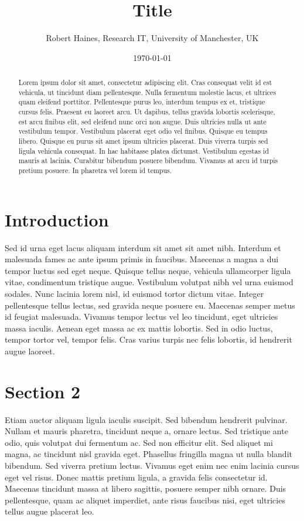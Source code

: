 \documentclass[11pt]{article}
\begin{document}
\title{Title}
\author{Robert Haines, Research IT, University of Manchester, UK}
\date{\today}
\maketitle

\begin{abstract}
Lorem ipsum dolor sit amet, consectetur adipiscing elit. Cras consequat velit id est vehicula, ut tincidunt diam pellentesque. Nulla fermentum molestie lacus, et ultrices quam eleifend porttitor. Pellentesque purus leo, interdum tempus ex et, tristique cursus felis. Praesent eu laoreet arcu. Ut dapibus, tellus gravida lobortis scelerisque, est arcu finibus elit, sed eleifend nunc orci non augue. Duis ultricies nulla ut ante vestibulum tempor. Vestibulum placerat eget odio vel finibus. Quisque eu tempus libero. Quisque eu purus sit amet ipsum ultricies placerat. Duis viverra turpis sed ligula vehicula consequat. In hac habitasse platea dictumst. Vestibulum egestas id mauris at lacinia. Curabitur bibendum posuere bibendum. Vivamus at arcu id turpis pretium posuere. In pharetra vel lorem id tempus.
\end{abstract}

\section{Introduction}

Sed id urna eget lacus aliquam interdum sit amet sit amet nibh. Interdum et malesuada fames ac ante ipsum primis in faucibus. Maecenas a magna a dui tempor luctus sed eget neque. Quisque tellus neque, vehicula ullamcorper ligula vitae, condimentum tristique augue. Vestibulum volutpat nibh vel urna euismod sodales. Nunc lacinia lorem nisl, id euismod tortor dictum vitae. Integer pellentesque tellus lectus, sed gravida neque posuere eu. Maecenas semper metus id feugiat malesuada. Vivamus tempor lectus vel leo tincidunt, eget ultricies massa iaculis. Aenean eget massa ac ex mattis lobortis. Sed in odio luctus, tempor tortor vel, tempor felis. Cras varius turpis nec felis lobortis, id hendrerit augue laoreet.

\section{Section 2}

Etiam auctor aliquam ligula iaculis suscipit. Sed bibendum hendrerit pulvinar. Nullam et mauris pharetra, tincidunt neque a, ornare lectus. Sed tristique ante odio, quis volutpat dui fermentum ac. Sed non efficitur elit. Sed aliquet mi magna, ac tincidunt nisl gravida eget. Phasellus fringilla magna ut nulla blandit bibendum. Sed viverra pretium lectus. Vivamus eget enim nec enim lacinia cursus eget vel risus. Donec mattis pretium ligula, a gravida felis consectetur id. Maecenas tincidunt massa at libero sagittis, posuere semper nibh ornare. Duis pellentesque, quam ac aliquet imperdiet, ante risus faucibus nisi, eget ultricies tellus augue placerat leo.
\end{document}
